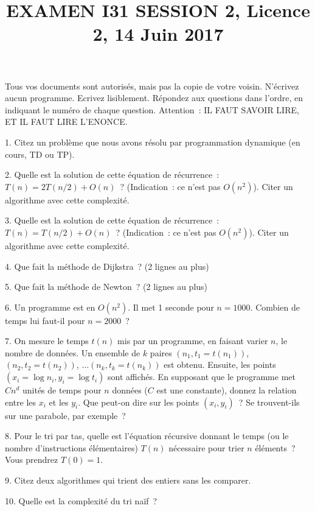 \documentclass[11pt]{article}
\begin{document}
\title{EXAMEN I31 SESSION 2, Licence 2, 14 Juin 2017}
\date{}
\maketitle

Tous vos documents sont autorisés, mais pas la copie de votre voisin.
N’écrivez aucun programme. Ecrivez lisiblement. Répondez aux questions
dans l’ordre, en indiquant le numéro de chaque question.
Attention~: IL FAUT SAVOIR LIRE, ET IL FAUT LIRE L'ENONCE.



{

1. Citez un problème que nous avons résolu par programmation dynamique (en cours, TD ou TP).
 
2. Quelle est la solution de cette équation de récurrence~: $T(n)=2 T(n/2) + O(n)$~? (Indication~: ce n'est pas $O(n^2)$). Citer un algorithme avec cette complexité. 
 
3. Quelle est la solution de cette équation de récurrence~: $T(n)=  T(n/2) + O(n
)$~? (Indication~: ce n'est pas $O(n^2)$). Citer un algorithme avec cette complexité. 
 
4. Que fait la méthode de Dijkstra~? (2 lignes au plus)
 
5. Que fait la méthode de Newton~? (2 lignes au plus)
 
6. Un programme est en $O(n^2)$. Il met 1 seconde pour $n=1000$. 
Combien de temps lui faut-il pour $n=2000$~?
 
7. On mesure le temps $t(n)$ mis par un programme, en faisant varier
$n$, le nombre de données. Un ensemble de $k$ paires $(n_1, t_1=t(n_1))$,
$(n_2, t_2=t(n_2))$, $\ldots (n_k, t_k=t(n_k))$ est obtenu.
Ensuite, les points $(x_i=\log n_i, y_i=\log t_i)$ sont affichés.
En supposant que le programme met $C n^d$ unités de temps pour $n$ données ($C$ est une constante), donnez la relation entre
les $x_i$ et les $y_i$.  Que peut-on dire sur les points $(x_i, y_i)$~?
Se trouvent-ils sur une parabole, par exemple~?
 
8. Pour le tri par tas, quelle est l'équation récursive
donnant le temps  (ou  le nombre d'instructions élémentaires) $T(n)$ nécessaire pour trier $n$ éléments~? Vous prendrez $T(0)=1$. 
 
9.  Citez deux algorithmes qui trient des entiers sans les comparer.
 
10.  Quelle est la complexité du tri naïf~?
 
}
\end{document}
